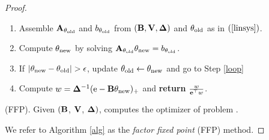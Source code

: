 \documentclass[12pt,leqno,letterpaper]{article}
\begin{document}
\begin{proof}
\begin{algorithm}[hpt!]
\begin{enumerate}[label=\textbf{\arabic*.},
  itemindent=0.32in, itemsep=0.032in]
\item Assemble $\mathbf{A}_{\theta_{\text{old}}}$ and $b_{\theta_{\text{old}}}$ 
from 
$(\mathbf{B}, \mathbf{V}, {\bm{\Delta}})$ and $\theta_{\text{old}}$ as in $\req{linsys}$. \label{loop}
\item Compute $\theta_{\text{new}}$ by solving 
$\mathbf{A}_{\theta_{\text{old}}} \theta_{\text{new}} = b_{\theta_{\text{old}}}$. 
\item If $| \theta_{\text{new}} - \theta_{\text{old}} | >\epsilon$, 
update $\theta_{\text{old}} \leftarrow \theta_{\text{new}}$ and go to Step \ref{loop}
\item Compute $w={\bm{\Delta}}^{-1}(\mathrm{e}-\mathbf{B} \theta_{\text{new}})_+$
and {\bf return} $\frac{w}{\mathbf{e}^\top w}$.
\end{enumerate}
\caption{(FFP). Given $(\mathbf{B}$, $\mathbf{V}$, ${\bm{\Delta}})$, computes
the optimizer of problem . }
\label{alg}
\end{algorithm}
We refer to Algorithm \ref{alg} as the \emph{factor fixed point}
(FFP) method. 
\end{proof}
\newpage
\end{document}
